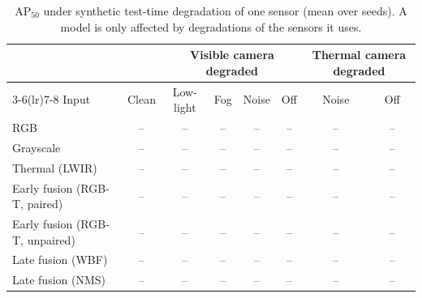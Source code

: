 \begin{table}[t]\centering\caption{AP$_{50}$ under synthetic test-time degradation of one sensor (mean over seeds). A model is only affected by degradations of the sensors it uses.}\label{tab:robust}
\footnotesize
\begin{tabular}{@{}lccccccc@{}}\toprule
& & \multicolumn{4}{c}{Visible camera degraded} & \multicolumn{2}{c}{Thermal camera degraded} \\ \cmidrule(lr){3-6}\cmidrule(lr){7-8}
Input & Clean & Low-light & Fog & Noise & Off & Noise & Off \\ \midrule
RGB & -- & -- & -- & -- & -- & -- & -- \\
Grayscale & -- & -- & -- & -- & -- & -- & -- \\
Thermal (LWIR) & -- & -- & -- & -- & -- & -- & -- \\
Early fusion (RGB-T, paired) & -- & -- & -- & -- & -- & -- & -- \\
Early fusion (RGB-T, unpaired) & -- & -- & -- & -- & -- & -- & -- \\
Late fusion (WBF) & -- & -- & -- & -- & -- & -- & -- \\
Late fusion (NMS) & -- & -- & -- & -- & -- & -- & -- \\
\bottomrule\end{tabular}
\end{table}

